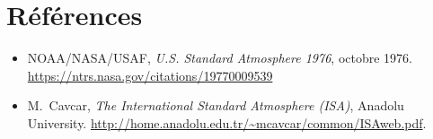\documentclass[a4paper,11pt]{article}
\begin{document}
\section*{Références}

\begin{itemize}
  \item NOAA/NASA/USAF, \emph{U.S. Standard Atmosphere 1976}, octobre 1976.
        \url{https://ntrs.nasa.gov/citations/19770009539}
  \item M.~Cavcar, \emph{The International Standard Atmosphere (ISA)},
        Anadolu University.
        \url{http://home.anadolu.edu.tr/~mcavcar/common/ISAweb.pdf}.

\end{itemize}
\end{document}
